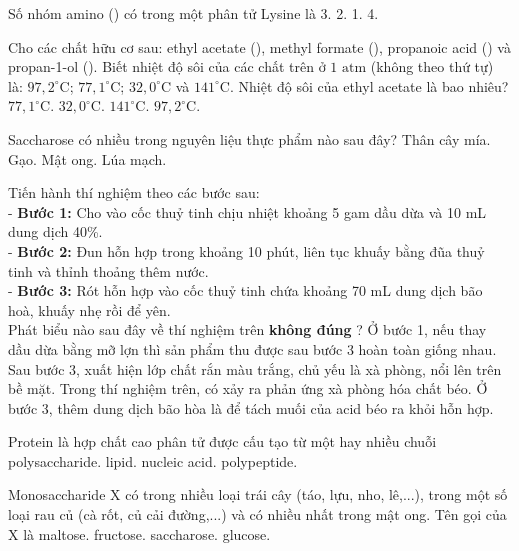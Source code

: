 \documentclass[11pt,a4paper]{article}
\begin{document}
\begin{ex}
Số nhóm amino () có trong một phân tử Lysine là
\choice
{3.}
{2.}
{1.}
{4.}
\loigiai{}
\end{ex}
\begin{ex}
Cho các chất hữu cơ sau: ethyl acetate (), methyl formate (), propanoic acid () và propan-1-ol (). Biết nhiệt độ sôi của các chất trên ở $1\text{ atm}$ (không theo thứ tự) là: $97{,}2^\circ\text{C}$; $77{,}1^\circ\text{C}$; $32{,}0^\circ\text{C}$ và $141^\circ\text{C}$. Nhiệt độ sôi của ethyl acetate là bao nhiêu?
\choice
{$77{,}1^\circ\text{C}$.}
{$32{,}0^\circ\text{C}$.}
{$141^\circ\text{C}$.}
{$97{,}2^\circ\text{C}$.}
\loigiai{}
\end{ex}
\begin{ex}
Saccharose có nhiều trong nguyên liệu thực phẩm nào sau đây?
\choice
{Thân cây mía.}
{Gạo.}
{Mật ong.}
{Lúa mạch.}
\loigiai{}
\end{ex}
\begin{ex}
Tiến hành thí nghiệm theo các bước sau:\\- \textbf{Bước 1:} Cho vào cốc thuỷ tinh chịu nhiệt khoảng 5 gam dầu dừa và 10 mL dung dịch  40\%.\\- \textbf{Bước 2:} Đun hỗn hợp trong khoảng 10 phút, liên tục khuấy bằng đũa thuỷ tinh và thỉnh thoảng thêm nước.\\- \textbf{Bước 3:} Rót hỗn hợp vào cốc thuỷ tinh chứa khoảng 70 mL dung dịch  bão hoà, khuấy nhẹ rồi để yên.\\Phát biểu nào sau đây về thí nghiệm trên \textbf{không đúng} ?
\choice
{Ở bước 1, nếu thay dầu dừa bằng mỡ lợn thì sản phẩm thu được sau bước 3 hoàn toàn giống nhau.}
{Sau bước 3, xuất hiện lớp chất rắn màu trắng, chủ yếu là xà phòng, nổi lên trên bề mặt.}
{Trong thí nghiệm trên, có xảy ra phản ứng xà phòng hóa chất béo.}
{Ở bước 3, thêm dung dịch  bão hòa là để tách muối của acid béo ra khỏi hỗn hợp.}
\loigiai{}
\end{ex}
\begin{ex}
Protein là hợp chất cao phân tử được cấu tạo từ một hay nhiều chuỗi
\choice
{polysaccharide.}
{lipid.}
{nucleic acid.}
{polypeptide.}
\loigiai{}
\end{ex}
\begin{ex}
Monosaccharide X có trong nhiều loại trái cây (táo, lựu, nho, lê,...), trong một số loại rau củ (cà rốt, củ cải đường,...) và có nhiều nhất trong mật ong. Tên gọi của X là
\choice
{maltose.}
{fructose.}
{saccharose.}
{glucose.}
\loigiai{}
\end{ex}
\end{document}
